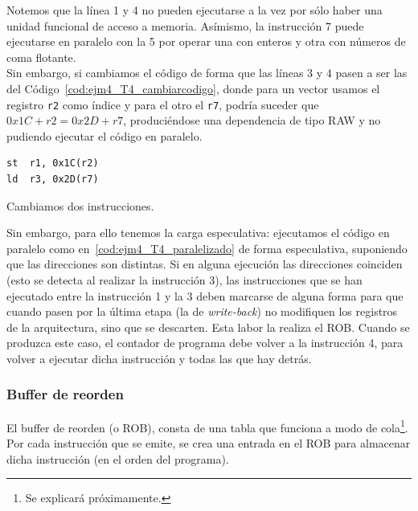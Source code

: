 \begin{ejemplo}
    Notemos que la línea 1 y 4 no pueden ejecutarse a la vez por sólo haber una unidad funcional de acceso a memoria. Asímismo, la instrucción 7 puede ejecutarse en paralelo con la 5 por operar una con enteros y otra con números de coma flotante.\\
    
    Sin embargo, si cambiamos el código de forma que las líneas 3 y 4 pasen a ser las del Código~\ref{cod:ejm4_T4_cambiarcodigo}, donde para un vector usamos el registro \verb|r2| como índice y para el otro el \verb|r7|, podría suceder que $0x1C + r2 = 0x2D + r7$, produciéndose una dependencia de tipo RAW y no pudiendo ejecutar el código en paralelo.
    \begin{listing}[H]
    \begin{verbatim}
st  r1, 0x1C(r2)
ld  r3, 0x2D(r7)
    \end{verbatim}
    \caption{Cambiamos dos instrucciones.}
    \label{cod:ejm4_T4_cambiarcodigo}
    \end{listing}
    Sin embargo, para ello tenemos la carga especulativa: ejecutamos el código en paralelo como en~\ref{cod:ejm4_T4_paralelizado} de forma especulativa, suponiendo que las direcciones son distintas. Si en alguna ejecución las direcciones coinciden (esto se detecta al realizar la instrucción 3), las instrucciones que se han ejecutado entre la instrucción 1 y la 3 deben marcarse de alguna forma para que cuando pasen por la última etapa (la de \emph{write-back}) no modifiquen los registros de la arquitectura, sino que se descarten. Esta labor la realiza el ROB\@. Cuando se produzca este caso, el contador de programa debe volver a la instrucción 4, para volver a ejecutar dicha instrucción y todas las que hay detrás.
\end{ejemplo}

\subsubsection{Buffer de reorden}
El buffer de reorden (o ROB), consta de una tabla que funciona a modo de cola\footnote{Se explicará próximamente.}. Por cada instrucción que se emite, se crea una entrada en el ROB para almacenar dicha instrucción (en el orden del programa).

